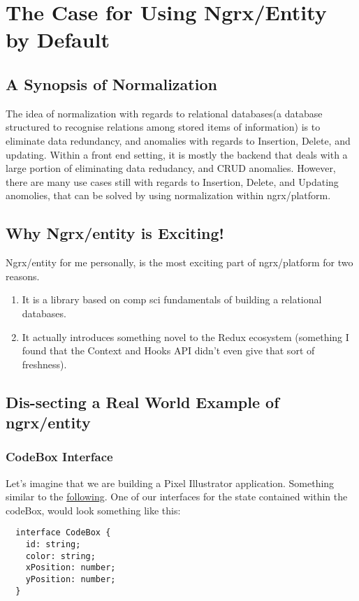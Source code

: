 \maketitle{}
\section{ The Case for Using Ngrx/Entity by Default}

\subsection{ A Synopsis of Normalization}
The idea of normalization with regards to relational databases(a database
structured to recognise relations among stored items of information) is to
eliminate data redundancy, and anomalies with regards to Insertion, Delete, and
updating. Within a front end setting, it is mostly the backend that deals with
a large portion of eliminating data redudancy, and CRUD anomalies. However,
there are many use cases still with regards to Insertion, Delete, and Updating
anomolies, that can be solved by using normalization within ngrx/platform.

\subsection{Why Ngrx/entity is Exciting!}
Ngrx/entity for me personally, is the most exciting part of ngrx/platform for
two reasons.
\begin{enumerate}
  \item It is a library based on comp sci fundamentals of building a relational
  databases.
  \item It actually introduces something novel to the Redux ecosystem (something
  I found that the Context and Hooks API didn't even give that sort of
  freshness).
\end{enumerate}

\subsection{Dis-secting a Real World Example of ngrx/entity}

\subsubsection{CodeBox Interface}
Let's imagine that we are building a Pixel Illustrator application. Something
similar to the \href{http://charliegreenman.github.io/codeILL/}{following}. One
of our interfaces for the state contained within the codeBox, would look
something like this:
\begin{lstlisting}
  interface CodeBox {
    id: string;
    color: string;
    xPosition: number;
    yPosition: number;
  }
\end{lstlisting}

